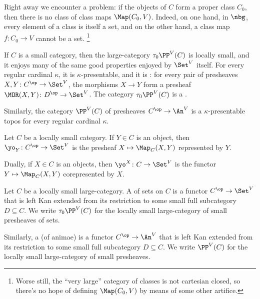 Right away we encounter a problem:
if the objects of $ C $ form a proper class $ C_ 0 $,
then there is no class of class maps $ \Map(C_0, V) $.
Indeed, on one hand, in $ \nbg $, every element of a class is itself a set,
and on the other hand, a class map $ f \colon C_0 \to V $ cannot be a set.%
\footnote{Worse still, the \enquote{very large}
	category of classes is not cartesian closed,
	so there's no hope of defining
	$ \Map(C_0, V) $ by means of some other artifice.}

\begin{nul}
	If $ C $ is a small category, then 
	the large-category $ \tau_0\PP^V(C) $ is locally small,
	and it enjoys many of the same good properties
	enjoyed by $ \Set^V $ itself.
	For every regular cardinal $ \kappa $,
	it is $ \kappa $-presentable,
	and it is :
	for every pair of presheaves $ X, Y \colon C^{\op} \to \Set^V $,
	the morphisms $ X \to Y $
	form a presheaf $ \MOR(X, Y) \colon D^{\op} \to \Set^V $.
	The category $ \tau_0\PP^V(C) $ is a .

	Similarly, the category $ \PP^V(C) $ of presheaves
	$ C^{\op} \to \An^V $
	is a $ \kappa $-presentable topos
	for every regular cardinal $ \kappa $.
\end{nul}

\begin{eg}
	Let $ C $ be a locally small category.
	If $ Y \in C $ is an object,
	then $ \yo_Y \colon C^{\op} \to \Set^V $ is
	the presheaf $ X \mapsto \Map_C(X,Y) $ represented by $ Y $.

	Dually, if $ X \in C $ is an objects,
	then $ \yo^X \colon C \to \Set^V $ is the functor
	$ Y \mapsto \Map_C(X,Y) $ corepresented by $ X $.
\end{eg}

\begin{definition}
	Let $ C $ be a locally small large-category.
	A  of sets on $ C $ is
	a functor $ C^{\op} \to \Set^V $
	that is left Kan extended from its restriction
	to some small full subcategory $ D \subseteq C $.
	We write $ \tau_0\PP^V(C) $
	for the locally small large-category
	of small presheaves of sets.
	
	Similarly, a  (of animae) is
	a functor $ C^{\op} \to \An^V $
	that is left Kan extended from its restriction to
	some small full subcategory $ D \subseteq C $.
	We write $ \PP^V(C) $
	for the locally small large-category
	of small presheaves.
\end{definition}

